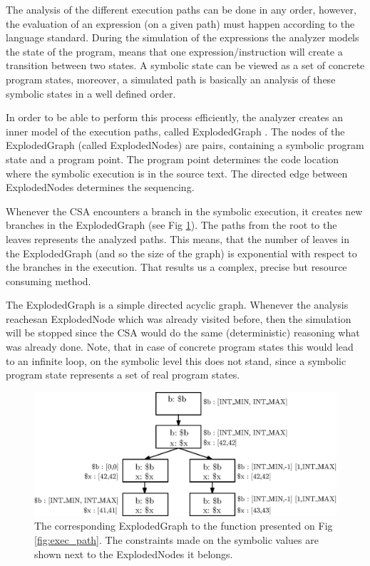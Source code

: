 The analysis of the different execution paths can be done in any order, 
however, the evaluation of an expression (on a given path) must happen 
according to the language standard.  
During the simulation of the expressions the analyzer models the state of the 
program, means that one expression/instruction will create a transition between 
two states. A symbolic state can be viewed as a set of concrete program states, 
moreover, a simulated path is basically an analysis of these symbolic states in 
a well defined order. 

In order to be able to perform this process efficiently, the analyzer creates 
an inner model of the execution paths, called ExplodedGraph 
\cite{explodedgraph}. The nodes of the ExplodedGraph (called ExplodedNodes) are 
pairs, containing a symbolic program state and a program point. The program 
point determines the code location where the symbolic execution is in the 
source text. The directed edge between ExplodedNodes determines the sequencing.

Whenever the CSA encounters a branch in the symbolic execution, it creates new 
branches in the ExplodedGraph (see Fig \ref{fig:exploded_graph}). The paths
from the root to the leaves represents the analyzed paths. This means, that the 
number of leaves in the ExplodedGraph (and so the size of the graph) is 
exponential with respect to the branches in the execution. That results us a 
complex, precise but resource consuming method.

The ExplodedGraph is a simple directed acyclic graph. Whenever the analysis 
reachesan ExplodedNode which was already visited before, then the simulation 
will be stopped since the CSA would do the same (deterministic) reasoning what 
was already done. Note, that in case of concrete program states this would lead 
to an infinite loop, on the symbolic level this does not stand, since a
symbolic program state represents a set of real program states.

\begin{figure}[h]
	\centering
	\includegraphics[width=1\textwidth]{img/explodedgraph.eps}
	\caption{The corresponding ExplodedGraph to the function presented on Fig 
		\ref{fig:exec_path}. The constraints made on the symbolic values are 
		shown next to the ExplodedNodes it belongs.}
	\label{fig:exploded_graph}
\end{figure}

